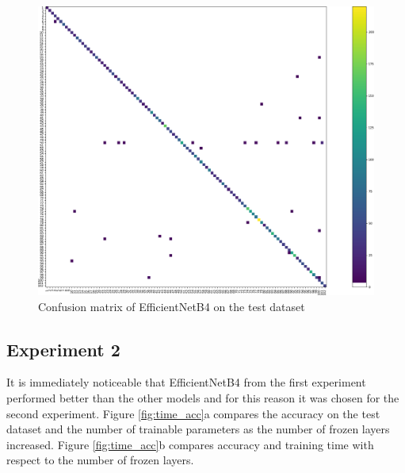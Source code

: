 \begin{figure}[ht!]
\centering
\includegraphics[width=1\textwidth]{images/cm.png} 
\caption{Confusion matrix of EfficientNetB4 on the test dataset}
\label{fig:cm}
\end{figure}

\subsection{Experiment 2}


It is immediately noticeable that EfficientNetB4 from the first experiment performed better than the other models and for this reason it was chosen for the second experiment. Figure \ref{fig:time_acc}a compares the accuracy on the test dataset and the number of trainable parameters as the number of frozen layers increased. Figure \ref{fig:time_acc}b compares accuracy and training time with respect to the number of frozen layers.




